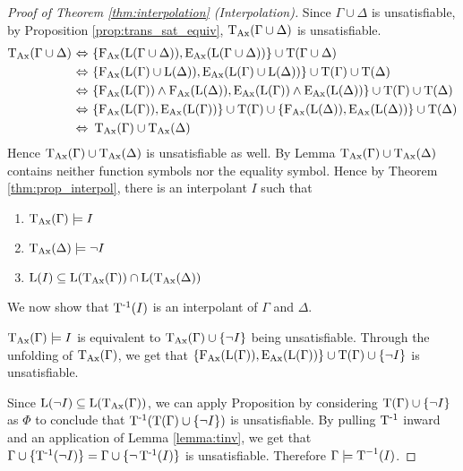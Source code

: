 \begin{proof}[Proof of Theorem \ref{thm:interpolation} (Interpolation)]

	Since $\Gamma \cup \Delta$ is unsatisfiable,
	by Proposition \ref{prop:trans_sat_equiv}, $\TransAll(\Gamma \cup \Delta)$ is unsatisfiable.
	\begin{align*}
		\TransAll(\Gamma \cup \Delta)\,\liff~&\{\FAX(\Lang(\Gamma\cup\Delta)), \EAX(\Lang(\Gamma \cup\Delta))\} \cup \Trans(\Gamma \cup \Delta) \\
		\liff~&\{\FAX(\Lang(\Gamma)\cup\Lang(\Delta)), \EAX(\Lang(\Gamma)\cup\Lang(\Delta))\} \cup \Trans(\Gamma )\cup \Trans(\Delta) \\
		\liff~&\{\FAX(\Lang(\Gamma)) \land \FAX(\Lang(\Delta)), \EAX(\Lang(\Gamma)) \land \EAX(\Lang(\Delta))\} \cup \Trans(\Gamma) \cup \Trans(\Delta) \\
		\liff~&\{\FAX(\Lang(\Gamma)),\EAX(\Lang(\Gamma))\} \cup \Trans(\Gamma) \cup \{\FAX(\Lang(\Delta)), \EAX(\Lang(\Delta))\} \cup \Trans(\Delta) \\
		\liff~&\TransAll(\Gamma) \cup \TransAll(\Delta)
	\end{align*}
	Hence  $\TransAll(\Gamma) \cup \TransAll(\Delta)$ is unsatisfiable as well.
	By Lemma  $\TransAll(\Gamma) \cup \TransAll(\Delta)$ contains neither function symbols nor the equality symbol.
	Hence by Theorem \ref{thm:prop_interpol}, there is an interpolant $I$ such that
	\begin{enumerate}
		\item $\TransAll(\Gamma) \entails I$
		\item $\TransAll(\Delta) \entails \lnot I$ 
		\item $\Lang(I) \subseteq \Lang(\TransAll(\Gamma)) \cap \Lang(\TransAll(\Delta))$
			\label{proof:interpolation1_3}
	\end{enumerate}

	We now show that $\TransInv(I)$ is an interpolant of $\Gamma$ and $\Delta$.

	$\TransAll(\Gamma) \entails I$ is equivalent to $\TransAll(\Gamma) \cup \{\lnot I\}$ being unsatisfiable.
	Through the unfolding of $\TransAll(\Gamma)$, we get that 
	$\{\FAX(\Lang(\Gamma)), \EAX(\Lang(\Gamma))\} \cup \Trans(\Gamma) \cup \{\lnot I\}$ is unsatisfiable.

	Since $\Lang(\lnot I) \subseteq \Lang(\TransAll(\Gamma))$, we can apply Proposition
	by considering $\Trans(\Gamma) \cup \{\lnot I\}$ as $\Phi$ to conclude that $\TransInv(\Trans(\Gamma) \cup \{\lnot I\})$ is unsatisfiable. By pulling $\TransInv$ inward and an application of Lemma \ref{lemma:tinv}, we get that $\Gamma \cup \{\TransInv(\lnot I)\} = \Gamma \cup \{\lnot \TransInv(I)\}$ is unsatisfiable. 
	Therefore $\Gamma \entails \Trans^{-1}(I)$.


\end{proof}
